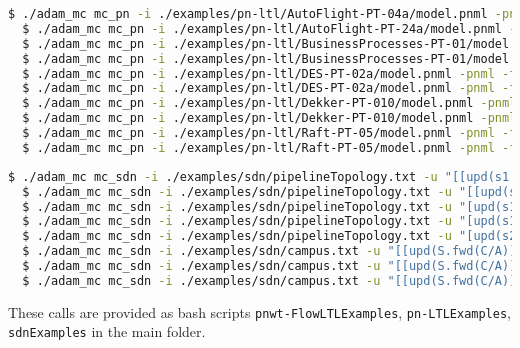 \documentclass[12pt,twoside,a4paper,openright]{memoir}
\begin{document}
\begin{lstlisting}[captionpos=b, caption=Example calls for checking Petri nets against LTL., label=lst:pnLTLEx, language=bash,breaklines=true]
  $ ./adam_mc mc_pn -i ./examples/pn-ltl/AutoFlight-PT-04a/model.pnml -pnml -f "NEG (p73 AND NEG p74)" -psst # SAT
  $ ./adam_mc mc_pn -i ./examples/pn-ltl/AutoFlight-PT-24a/model.pnml -pnml -f "(NEG p453 OR p129)" -v # SAT
  $ ./adam_mc mc_pn -i ./examples/pn-ltl/BusinessProcesses-PT-01/model.pnml -pnml -f "FALSE" -veri "IC3|BMC2" # UNSAT
  $ ./adam_mc mc_pn -i ./examples/pn-ltl/BusinessProcesses-PT-01/model.pnml -pnml -f "G X F G p171" -veri "BMC3" # UNSAT
  $ ./adam_mc mc_pn -i ./examples/pn-ltl/DES-PT-02a/model.pnml -pnml -f "F F (FALSE U NEG (p35 AND NEG p93))" -veri "IC3" # SAT
  $ ./adam_mc mc_pn -i ./examples/pn-ltl/DES-PT-02a/model.pnml -pnml -f "(NEG (p66 AND NEG p51) U (NEG (p94 AND NEG p73) U NEG (p47 AND NEG p7)))" -max IntF -v # SAT
  $ ./adam_mc mc_pn -i ./examples/pn-ltl/Dekker-PT-010/model.pnml -pnml -f "F NEG (p34 AND NEG p0_8)"  -stats "" # SAT
  $ ./adam_mc mc_pn -i ./examples/pn-ltl/Dekker-PT-010/model.pnml -pnml -f "G G G F NEG (p0_9 AND NEG flag_0_4)"  -veri "IC3|BMC2" # UNSAT
  $ ./adam_mc mc_pn -i ./examples/pn-ltl/Raft-PT-05/model.pnml -pnml -f "X G X F NEG (p62 AND NEG p120)" -veri "IC3|BMC3" # UNSAT
  $ ./adam_mc mc_pn -i ./examples/pn-ltl/Raft-PT-05/model.pnml -pnml -f "G p43" -veri "BMC2" -max NONE -psst # UNSAT
\end{lstlisting}
\begin{lstlisting}[captionpos=b, caption=Example calls for checking SDNs with updates.,label = lst:sdnEx, language=bash,breaklines=true]
  $ ./adam_mc mc_sdn -i ./examples/sdn/pipelineTopology.txt -u "[[upd(s1.fwd(s3/s2)) >> upd(s2.fwd(-/s4))] || upd(s3.fwd(s5))]" -f "A F (s4 OR s5)" # SAT
  $ ./adam_mc mc_sdn -i ./examples/sdn/pipelineTopology.txt -u "[[upd(s1.fwd(s3/s2)) >> upd(s2.fwd(-/s4))] || upd(s3.fwd(s5))]" -c loopFreedom -v # SAT
  $ ./adam_mc mc_sdn -i ./examples/sdn/pipelineTopology.txt -u "[upd(s1.fwd(s4/s2)) >> upd(s2.fwd(-/s4))]" -c connectivity # SAT
  $ ./adam_mc mc_sdn -i ./examples/sdn/pipelineTopology.txt -u "[upd(s1.fwd(s4/s2)) >> upd(s2.fwd(-/s4))]" -f "A F s2" -t # UNSAT
  $ ./adam_mc mc_sdn -i ./examples/sdn/pipelineTopology.txt -u "[upd(s2.fwd(s3/s4)) >> upd(s3.fwd(s5))]" -c dropFreedom # SAT
  $ ./adam_mc mc_sdn -i ./examples/sdn/campus.txt -u "[[upd(S.fwd(C/A)) >> upd(L.fwd(P/C))] || upd(C.fwd(L/P))]" -c dropFreedom # SAT
  $ ./adam_mc mc_sdn -i ./examples/sdn/campus.txt -u "[[upd(S.fwd(C/A)) >> upd(L.fwd(P/C))] || upd(C.fwd(L/P))]" -c connectivity # SAT
  $ ./adam_mc mc_sdn -i ./examples/sdn/campus.txt -u "[[upd(S.fwd(C/A)) >> upd(L.fwd(P/C))] || upd(C.fwd(L/P))]" -c loopFreedom # SAT
\end{lstlisting}
%
These calls are provided as bash scripts \texttt{pnwt-FlowLTLExamples}, \texttt{pn-LTLExamples}, \texttt{sdnExamples}
in the main folder.
\end{document}
